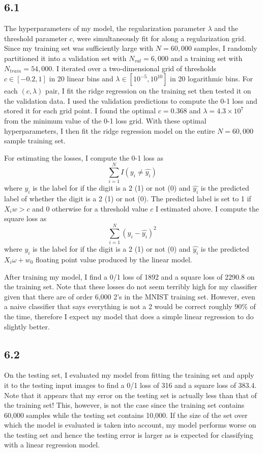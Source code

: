 \documentclass[12pt]{amsart}
\begin{document}
\subsection*{6.1}

The hyperparameters of my model, the regularization parameter $\lambda$ and the threshold parameter $c$, were simultaneously fit for along a regularization grid.  Since my training set was sufficiently large with $N = 60,000$ samples, I randomly partitioned it into a validation set with $N_{val} = 6,000$ and a training set with $N_{train} = 54,000$.  I iterated over a two-dimensional grid of thresholds $c \in [-0.2,1]$ in 20 linear bins and $\lambda \in [10^{-5},10^{10}]$ in 20 logarithmic bins.  For each $(c,\lambda)$ pair, I fit the ridge regression on the training set then tested it on the validation data.  I used the validation predictions to compute the 0-1 loss and stored it for each grid point.  I found the optimal $c = 0.368$ and $\lambda = 4.3 \times 10^7$ from the minimum value of the 0-1 loss grid.  With these optimal hyperparameters, I then fit the ridge regression model on the entire $N = 60,000$ sample training set.

For estimating the losses, I compute the 0-1 loss as
\begin{equation} \label{eqn:01_loss}
\sum_{i=1}^N I(y_i \neq \hat{y_i})
\end{equation}
where $y_i$ is the label for if the digit is a 2 (1) or not (0) and $\hat{y_i}$ is the predicted label of whether the digit is a 2 (1) or not (0).  The predicted label is set to 1 if $X_iw > c$ and 0 otherwise for a threshold value $c$ I estimated above.  I compute the square loss as
\begin{equation} \label{eqn:square_loss}
\sum_{i=1}^N (y_i - \hat{y_i})^2
\end{equation}
where $y_i$ is the label for if the digit is a 2 (1) or not (0) and $\hat{y_i}$ is the predicted $X_i \omega + w_0$ floating point value produced by the linear model.

After training my model, I find a 0/1 loss of 1892 and a square loss of 2290.8 on the training set.  Note that these losses do not seem terribly high for my classifier given that there are of order 6,000 2's in the MNIST training set.  However, even a naive classifier that says everything is not a 2 would be correct roughly $90\%$ of the time, therefore I expect my model that does a simple linear regression to do slightly better.

\subsection*{6.2}
On the testing set, I evaluated my model from fitting the training set and apply it to the testing input images to find a 0/1 loss of 316 and a square loss of 383.4.  Note that it appears that my error on the testing set is actually less than that of the training set!  This, however, is not the case since the training set contains 60,000 samples while the testing set contains 10,000.  If the size of the set over which the model is evaluated is taken into account, my model performs worse on the testing set and hence the testing error is larger as is expected for classifying with a linear regression model.
\end{document}
